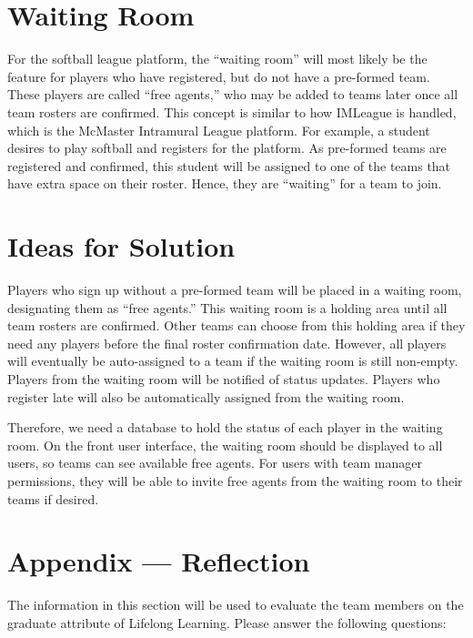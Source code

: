 \documentclass[12pt]{article}
\begin{document}
\section{Waiting Room}
For the softball league platform, the “waiting room” will most likely be the feature for players who have registered, but do not have a pre-formed team. These players are called “free agents,” who may be added to teams later once all team rosters are confirmed. This concept is similar to how IMLeague is handled, which is the McMaster Intramural League platform. For example, a student desires to play softball and registers for the platform. As pre-formed teams are registered and confirmed, this student will be assigned to one of the teams that have extra space on their roster. Hence, they are “waiting” for a team to join.

\section{Ideas for Solution}
Players who sign up without a pre-formed team will be placed in a waiting room, designating them as “free agents.” This waiting room is a holding area until all team rosters are confirmed. Other teams can choose from this holding area if they need any players before the final roster confirmation date. However, all players will eventually be auto-assigned to a team if the waiting room is still non-empty. Players from the waiting room will be notified of status updates. Players who register late will also be automatically assigned from the waiting room.

Therefore, we need a database to hold the status of each player in the waiting room. On the front user interface, the waiting room should be displayed to all users, so teams can see available free agents. For users with team manager permissions, they will be able to invite free agents from the waiting room to their teams if desired.


\newpage{}
\section*{Appendix --- Reflection}

The information in this section will be used to evaluate the team members on the
graduate attribute of Lifelong Learning.  Please answer the following questions:
\end{document}
